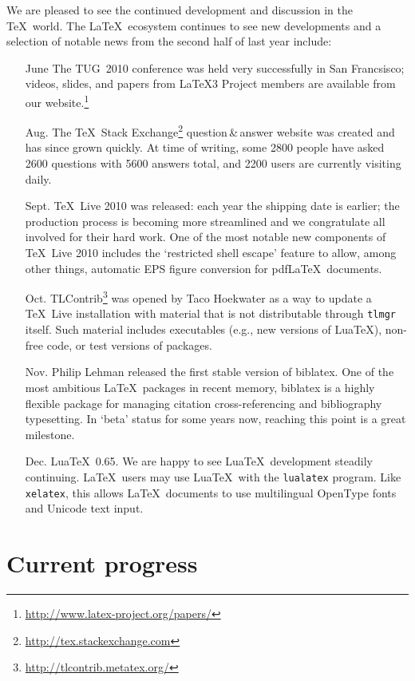 \documentclass{ltnews}
\begin{document}
We are pleased to see the continued development and discussion in the \TeX\ world.
The \LaTeX\ ecosystem continues to see new developments and a selection of notable news from the second half of last year include:
\begin{itemize}
\item[June] The TUG~2010 conference was held very successfully in San Francsisco; videos, slides, and papers from \LaTeX3 Project members are available from our website.\footnote{\url{http://www.latex-project.org/papers/}}
\item[Aug.] 
The \TeX\ Stack Exchange\footnote{\url{http://tex.stackexchange.com}} question\,\&\,answer website was created and has since grown quickly. At time of writing, some 2800 people have asked 2600 questions with 5600 answers total, and 2200 users are currently visiting daily.
\item[Sept.] \TeX\ Live 2010 was released: each year the shipping date is earlier; the production process is becoming more streamlined and we congratulate all involved for their hard work. One of the most notable new components of \TeX\ Live 2010 includes the `restricted shell escape' feature to allow, among other things, automatic EPS figure conversion for pdf\LaTeX\ documents.
\item[Oct.] TLContrib\footnote{\url{http://tlcontrib.metatex.org/}} was opened by Taco Hoekwater as a way to update a \TeX~Live installation with material that is not distributable through \verb|tlmgr| itself. Such material includes executables (e.g., new versions of Lua\TeX), non-free code, or test versions of packages.
\item[Nov.] Philip Lehman released the first stable version of \textsf{biblatex}. One of the most ambitious \LaTeX\ packages in recent memory, \textsf{biblatex} is a highly flexible package for managing citation cross-referencing and bibliography typesetting. In `beta' status for some years now, reaching this point is a great milestone.
\item[Dec.] Lua\TeX\ 0.65. We are happy to see Lua\TeX\ development steadily continuing. \LaTeX\ users may use Lua\TeX\ with the \verb|lualatex| program. Like \verb|xelatex|, this allows \LaTeX\ documents to use multilingual OpenType fonts and Unicode text input.
\end{itemize}

\section{Current progress}
\end{document}
